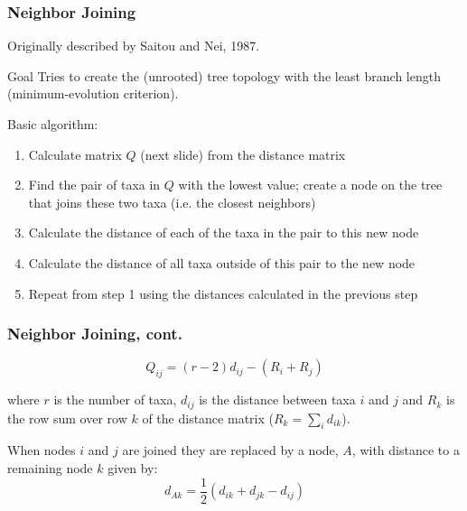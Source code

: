 \documentclass{beamer}
\begin{document}
{ 

}


\begin{frame}[shrink=5]
\frametitle{Neighbor Joining}

Originally described by Saitou and Nei, 1987.

\begin{block}{Goal}
Tries to create the (unrooted) tree topology with the least branch length
(minimum-evolution criterion).
\end{block}

Basic algorithm:
\begin{enumerate}
\item Calculate matrix $Q$ (next slide) from the distance matrix
\item Find the pair of taxa in $Q$ with the lowest value; create a node on the tree that joins these two taxa (i.e. the closest neighbors)
\item Calculate the distance of each of the taxa in the pair to this new node
\item Calculate the distance of all taxa outside of this pair to the new node
\item Repeat from step 1 using the distances calculated in the previous step
\end{enumerate}

\end{frame}

\begin{frame}
\frametitle{Neighbor Joining, cont.}

\[
Q_{ij} = (r - 2) d_{ij} - (R_i + R_j)
\]

where $r$ is the number of taxa, $d_{ij}$ is the distance between taxa $i$ and $j$ and $R_k$ is the row sum over row $k$ of the distance matrix ($R_k=\sum_i d_{ik}$).

\medskip

When nodes $i$ and $j$ are joined they are replaced by a node, $A$, with distance to a remaining node $k$ given by:
\[
d_{Ak} = \frac{1}{2} (d_{ik} + d_{jk} - d_{ij})
\]
    
\end{frame}
\end{document}
